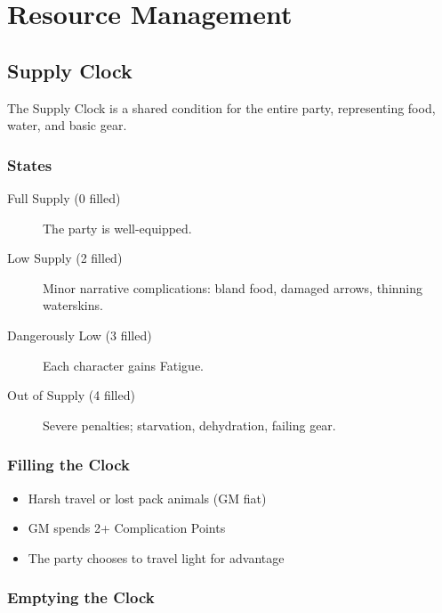 \chapter{Resource Management}

\section{Supply Clock}

The Supply Clock is a shared condition for the entire party, representing food, water, and basic gear.

\subsection{States}

\begin{description}
\item[Full Supply (0 filled)] The party is well-equipped.
\item[Low Supply (2 filled)] Minor narrative complications: bland food, damaged arrows, thinning waterskins.
\item[Dangerously Low (3 filled)] Each character gains Fatigue.
\item[Out of Supply (4 filled)] Severe penalties; starvation, dehydration, failing gear.
\end{description}

\subsection{Filling the Clock}

\begin{itemize}
\item Harsh travel or lost pack animals (GM fiat)
\item GM spends 2+ Complication Points
\item The party chooses to travel light for advantage
\end{itemize}

\subsection{Emptying the Clock}

